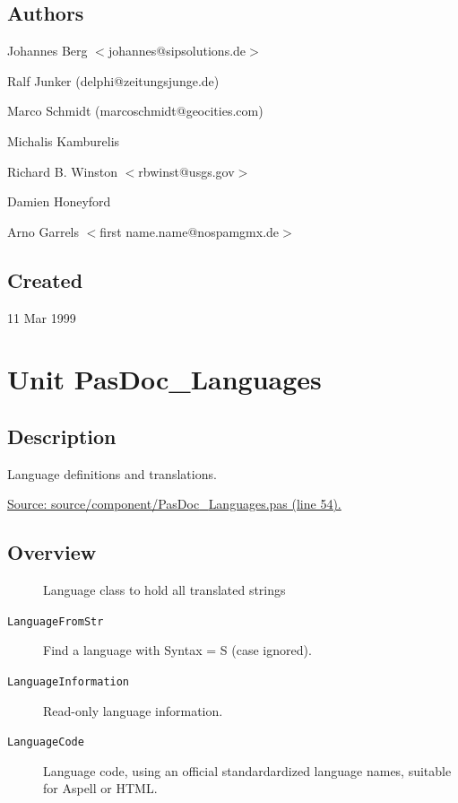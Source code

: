 \documentclass{report}
\begin{document}
\section{Authors}
\par
Johannes Berg {$<$}johannes@sipsolutions.de{$>$}

\par
Ralf Junker (delphi@zeitungsjunge.de)

\par
Marco Schmidt (marcoschmidt@geocities.com)

\par
Michalis Kamburelis

\par
Richard B. Winston {$<$}rbwinst@usgs.gov{$>$}

\par
Damien Honeyford

\par
Arno Garrels {$<$}first name.name@nospamgmx.de{$>$}

\section{Created}
\par
11 Mar 1999


\chapter{Unit PasDoc{\_}Languages}
\label{PasDoc_Languages}
\section{Description}
Language definitions and translations.\hfill\vspace*{1ex}

                            \par
\href{https://github.com/pasdoc/pasdoc/blob/master/source/component/PasDoc_Languages.pas#L54}{Source: source/component/PasDoc{\_}Languages.pas (line 54).}
\section{Overview}
\begin{description}
\item[\texttt{\begin{ttfamily}TLanguageRecord\end{ttfamily} Record}]
\item[\texttt{\begin{ttfamily}TPasDocLanguages\end{ttfamily} Class}]Language class to hold all translated strings
\end{description}
\begin{description}
\item[\texttt{LanguageFromStr}]Find a language with Syntax = S (case ignored).
\item[\texttt{LanguageInformation}]Read{-}only language information.
\item[\texttt{LanguageCode}]Language code, using an official standardardized language names, suitable for Aspell or HTML.
\end{description}
\end{document}
